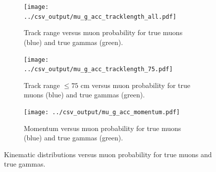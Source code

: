 \begin{figure}[htp]
\centering
	\begin{subfigure}[b]{.475\textwidth}
		\centering
		\texttt{[image: ../csv\_output/mu\_g\_acc\_tracklength\_all.pdf]}
		\caption{Track range versus muon probability for true muons (blue) and true gammas (green).}
		\label{fig:mug_tracklength}
	\end{subfigure}
	\begin{subfigure}[b]{.475\textwidth}
		\centering
		\texttt{[image: ../csv\_output/mu\_g\_acc\_tracklength\_75.pdf]}
		\caption{Track range $\leq 75$ cm versus muon probability for true muons (blue) and true gammas (green).}
		\label{fig:mug_tracklength75}
	\end{subfigure}
	\begin{subfigure}[b]{.475\textwidth}
		\centering
		\texttt{[image: ../csv\_output/mu\_g\_acc\_momentum.pdf]}
		\caption{Momentum versus muon probability for true muons (blue) and true gammas (green).}
		\label{fig:mug_momentum}
	\end{subfigure}
\caption{Kinematic distributions versus muon probability for true muons and true gammas.}
\label{fig:mug_kinematics}
\end{figure}


